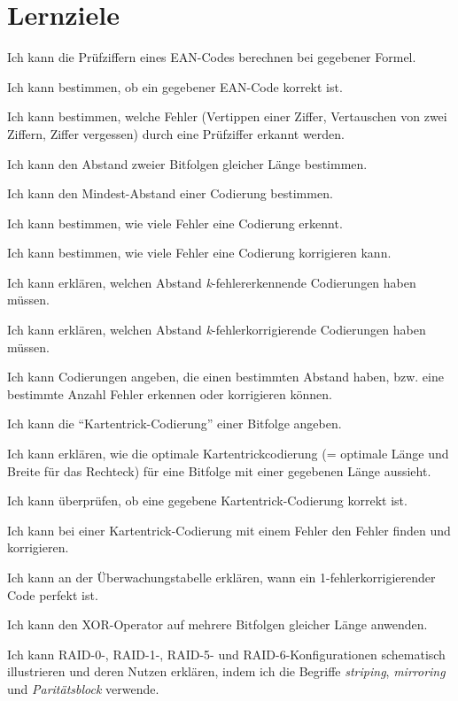 \chapter{Lernziele}
\begin{todolist}
    \item Ich kann die Prüfziffern eines \gls{EAN}-Codes berechnen bei gegebener Formel.
    \item Ich kann bestimmen, ob ein gegebener \gls{EAN}-Code korrekt ist.
    \item Ich kann bestimmen, welche Fehler (Vertippen einer Ziffer, Vertauschen von zwei Ziffern, Ziffer vergessen) durch eine Prüfziffer erkannt werden.
    \item Ich kann den Abstand zweier Bitfolgen gleicher Länge bestimmen.
    \item Ich kann den Mindest-Abstand einer Codierung bestimmen.
    \item Ich kann bestimmen, wie viele Fehler eine Codierung erkennt.
    \item Ich kann bestimmen, wie viele Fehler eine Codierung korrigieren kann.
    \item Ich kann erklären, welchen Abstand \textit{k}-fehlererkennende Codierungen haben müssen.
    \item Ich kann erklären, welchen Abstand \textit{k}-fehlerkorrigierende Codierungen haben müssen.
    \item Ich kann Codierungen angeben, die einen bestimmten Abstand haben, bzw. eine bestimmte Anzahl Fehler erkennen oder korrigieren können.
    \item Ich kann die \enquote{Kartentrick-Codierung} einer Bitfolge angeben.
    \item Ich kann erklären, wie die optimale Kartentrickcodierung (= optimale Länge und Breite für das Rechteck) für eine Bitfolge mit einer gegebenen Länge aussieht.
    \item Ich kann überprüfen, ob eine gegebene Kartentrick-Codierung korrekt ist.
    \item Ich kann bei einer Kartentrick-Codierung mit einem Fehler den Fehler finden und korrigieren.
    \item Ich kann an der Überwachungstabelle erklären, wann ein 1-fehlerkorrigierender Code perfekt ist.
    \item Ich kann den \acrshort{XOR}-Operator auf mehrere Bitfolgen gleicher Länge anwenden.
    \item Ich kann \gls{RAID}-0-, \gls{RAID}-1-, \gls{RAID}-5- und \gls{RAID}-6-Konfigurationen schematisch illustrieren und deren Nutzen erklären, indem ich die Begriffe \textit{striping}, \textit{mirroring} und \textit{Paritätsblock} verwende.

\end{todolist}
